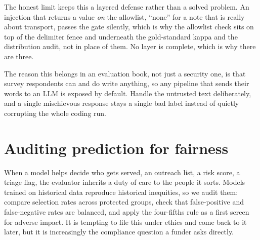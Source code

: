 \documentclass[
    a4paper,
    fontsize=10pt,
    twoside=true,
    numbers=noenddot,
]{kaobook}
\begin{document}
The honest limit keeps this a layered defense rather than a solved problem. An injection that returns a value \emph{on} the allowlist, \enquote{none} for a note that is really about transport, passes the gate silently, which is why the allowlist check sits on top of the delimiter fence and underneath the gold-standard kappa and the distribution audit, not in place of them. No layer is complete, which is why there are three.

The reason this belongs in an evaluation book, not just a security one, is that survey respondents can and do write anything, so any pipeline that sends their words to an LLM is exposed by default. Handle the untrusted text deliberately, and a single mischievous response stays a single bad label instead of quietly corrupting the whole coding run.

\section{Auditing prediction for fairness}\label{sec:fairness}
When a model helps decide who gets served, an outreach list, a risk score, a triage flag, the evaluator inherits a duty of care to the people it sorts. Models trained on historical data reproduce historical inequities, so we audit them: compare selection rates across protected groups, check that false-positive and false-negative rates are balanced, and apply the four-fifths rule as a first screen for adverse impact. It is tempting to file this under ethics and come back to it later, but it is increasingly the compliance question a funder asks directly.
\end{document}
